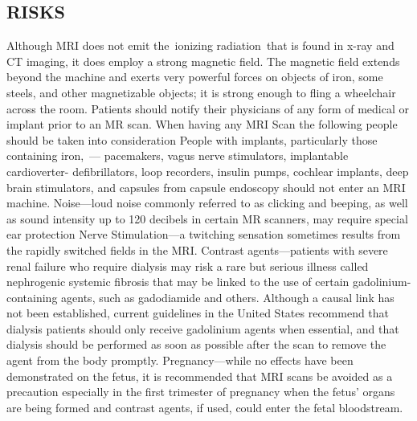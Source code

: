 \documentclass[12pt]{article}
\begin{document}
\subsection{RISKS}
Although MRI does not emit the ionizing radiation that is found in x-ray and CT imaging, it does employ a strong magnetic field. The magnetic field extends beyond the machine and exerts very powerful forces on objects of iron, some steels, and other magnetizable objects; it is strong enough to fling a wheelchair across the room. Patients should notify their physicians of any form of medical or implant prior to an MR scan.
When having any MRI Scan the following people should be taken into consideration
People with implants, particularly those containing iron, — pacemakers, vagus nerve stimulators, implantable cardioverter- defibrillators, loop recorders, insulin pumps, cochlear implants, deep brain stimulators, and capsules from capsule endoscopy should not enter an MRI machine.
Noise—loud noise commonly referred to as clicking and beeping, as well as sound intensity up to 120 decibels in certain MR scanners, may require special ear protection
Nerve Stimulation—a twitching sensation sometimes results from the rapidly switched fields in the MRI.
Contrast agents—patients with severe renal failure who require dialysis may risk a rare but serious illness called nephrogenic systemic fibrosis that may be linked to the use of certain gadolinium-containing agents, such as gadodiamide and others. Although a causal link has not been established, current guidelines in the United States recommend that dialysis patients should only receive gadolinium agents when essential, and that dialysis should be performed as soon as possible after the scan to remove the agent from the body promptly.
Pregnancy—while no effects have been demonstrated on the fetus, it is recommended that MRI scans be avoided as a precaution especially in the first trimester of pregnancy when the fetus’ organs are being formed and contrast agents, if used, could enter the fetal bloodstream.
\end{document}
